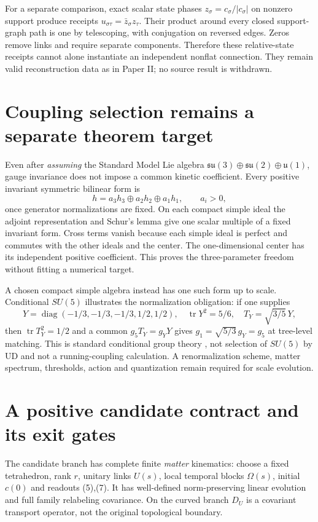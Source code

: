 \documentclass[11pt,a4paper]{article}
\newcommand{\tr}{\operatorname{tr}}
\begin{document}
For a separate comparison, exact scalar state phases
$z_\sigma=c_\sigma/|c_\sigma|$ on nonzero support produce receipts
$u_{\sigma\tau}=\bar z_\sigma z_\tau$. Their product around every
closed support-graph path is one by telescoping, with conjugation
on reversed edges. Zeros remove links and require separate
components. Therefore these relative-state receipts cannot alone
instantiate an independent nonflat connection. They remain valid
reconstruction data as in Paper II; no source result is withdrawn.

\section{Coupling selection remains a separate theorem target}
Even after \emph{assuming} the Standard Model Lie algebra
$\mathfrak{su}(3)\oplus\mathfrak{su}(2)\oplus\mathfrak u(1)$, gauge
invariance does not impose a common kinetic coefficient.
Every positive invariant symmetric bilinear form is
\[
 h=a_3h_3\oplus a_2h_2\oplus a_1h_1,\qquad a_i>0,          \tag{10}
\]
once generator normalizations are fixed.
On each compact simple ideal the adjoint representation and
Schur's lemma give one scalar multiple of a fixed invariant form.
Cross terms vanish because each simple ideal is perfect and
commutes with the other ideals and the center. The one-dimensional
center has its independent positive coefficient. This proves
the three-parameter freedom without fitting a numerical target.

A chosen compact simple algebra instead has one such form up
to scale. Conditional $SU(5)$ illustrates the normalization
obligation: if one supplies
\[
 Y=\operatorname{diag}(-1/3,-1/3,-1/3,1/2,1/2),\quad
 \tr Y^2=5/6,\quad T_Y=\sqrt{3/5}\,Y ,
\]
then $\tr T_Y^2=1/2$ and a common $g_5T_Y=g_YY$ gives
$g_1=\sqrt{5/3}\,g_Y=g_5$ at tree-level matching.
This is standard conditional group theory \cite{PDG}, not selection
of $SU(5)$ by UD and not a running-coupling calculation. A
renormalization scheme, matter spectrum, thresholds, action and
quantization remain required for scale evolution.

\section{A positive candidate contract and its exit gates}
The candidate branch has complete finite \emph{matter} kinematics:
choose a fixed tetrahedron, rank $r$, unitary links $U(s)$, local
temporal blocks $\Omega(s)$, initial $c(0)$ and readouts (5),(7).
It has well-defined norm-preserving linear evolution and full
family relabeling covariance. On the curved branch $D_U$ is a
covariant transport operator, not the original topological boundary.
\end{document}
